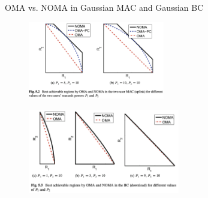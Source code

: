 \documentclass[aspectratio=43, 10pt]{beamer}
\begin{document}
    
    \begin{frame}{OMA vs. NOMA in Gaussian MAC and Gaussian BC}
        \vspace{-0.3em}
        \begin{figure}
            \centering
                \includegraphics[width=0.53\textwidth]{figures/2tGMAC_vs.png}
        \end{figure}

        \pause
        \vspace{-0.3em}
        \begin{figure}
            \centering
                \includegraphics[width=0.59\textwidth]{figures/2rGBC_vs.png}
        \end{figure}
    \end{frame}
\end{document}
